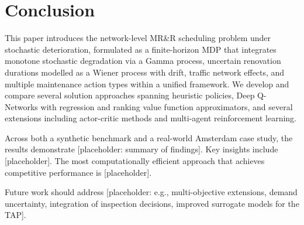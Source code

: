 \documentclass[3p, twocolumn]{elsarticle}
\begin{document}
\section{Conclusion}
\label{sec:conclusion}

This paper introduces the network-level MR\&R scheduling problem under stochastic deterioration, formulated as a finite-horizon MDP that integrates monotone stochastic degradation via a Gamma process, uncertain renovation durations modelled as a Wiener process with drift, traffic network effects, and multiple maintenance action types within a unified framework. We develop and compare several solution approaches spanning heuristic policies, Deep Q-Networks with regression and ranking value function approximators, and several extensions including actor-critic methods and multi-agent reinforcement learning.

Across both a synthetic benchmark and a real-world Amsterdam case study, the results demonstrate [placeholder: summary of findings]. Key insights include [placeholder]. The most computationally efficient approach that achieves competitive performance is [placeholder].

Future work should address [placeholder: e.g., multi-objective extensions, demand uncertainty, integration of inspection decisions, improved surrogate models for the TAP].



\end{document}
